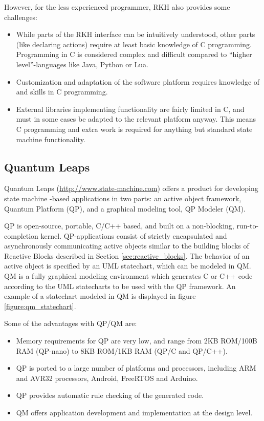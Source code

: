 However, for the less experienced programmer, RKH also provides some challenges:
\begin{itemize}
	\item While parts of the RKH interface can be intuitively understood, other parts (like declaring actions) require at least basic knowledge of C programming. Programming in C is considered complex and difficult compared to “higher level”-languages like Java, Python or Lua.
	\item Customization and adaptation of the software platform requires knowledge of and skills in C programming.
	\item External libraries implementing functionality are fairly limited in C, and must in some cases be adapted to the relevant platform anyway. This means C programming and extra work is required for anything but standard state machine functionality.
\end{itemize}

\subsection{Quantum Leaps}
\label{sec:quantum_leaps}
Quantum Leaps (\url{http://www.state-machine.com}) offers a product for developing state machine -based applications in two parts: an active object framework, Quantum Platform (QP), and a graphical modeling tool, QP Modeler (QM).

QP is open-source, portable, C/C++ based, and built on a non-blocking, run-to-completion kernel. QP-applications consist of strictly encapsulated and asynchronously communicating active objects similar to the building blocks of Reactive Blocks described in Section \ref{sec:reactive_blocks}. The behavior of an active object is specified by an UML statechart, which can be modeled in QM. QM is a fully graphical modeling environment which generates C or C++ code according to the UML statecharts to be used with the QP framework. An example of a statechart modeled in QM is displayed in figure \ref{figure:qm_statechart}.

Some of the advantages with QP/QM are:
\begin{itemize}
	\item Memory requirements for QP are very low, and range from 2KB ROM/100B RAM (QP-nano) to 8KB ROM/1KB RAM (QP/C and QP/C++).
	\item QP is ported to a large number of platforms and processors, including ARM and AVR32 processors, Android, FreeRTOS and Arduino.
	\item QP provides automatic rule checking of the generated code.
	\item QM offers application development and implementation at the design level.
\end{itemize}

